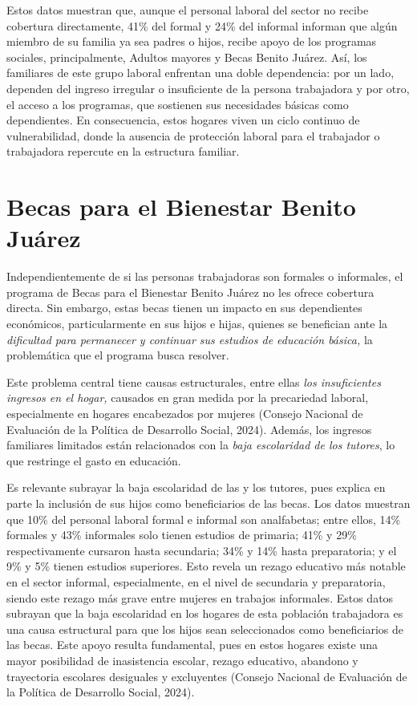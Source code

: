 \documentclass[
  spanish,
  11.5pt,
  170mm x 240mmpaper,
]{scrbook}
\begin{document}
Estos datos muestran que, aunque el personal laboral del sector no
recibe cobertura directamente, 41\% del formal y 24\% del informal
informan que algún miembro de su familia ya sea padres o hijos, recibe
apoyo de los programas sociales, principalmente, Adultos mayores y Becas
Benito Juárez. Así, los familiares de este grupo laboral enfrentan una
doble dependencia: por un lado, dependen del ingreso irregular o
insuficiente de la persona trabajadora y por otro, el acceso a los
programas, que sostienen sus necesidades básicas como dependientes. En
consecuencia, estos hogares viven un ciclo continuo de vulnerabilidad,
donde la ausencia de protección laboral para el trabajador o trabajadora
repercute en la estructura familiar.

\section{Becas para el Bienestar Benito
Juárez}\label{becas-para-el-bienestar-benito-juuxe1rez}

Independientemente de si las personas trabajadoras son formales o
informales, el programa de Becas para el Bienestar Benito Juárez no les
ofrece cobertura directa. Sin embargo, estas becas tienen un impacto en
sus dependientes económicos, particularmente en sus hijos e hijas,
quienes se benefician ante la \emph{dificultad para permanecer y
continuar sus estudios de educación básica,} la problemática que el
programa busca resolver.

Este problema central tiene causas estructurales, entre ellas \emph{los
insuficientes ingresos en el hogar,} causados en gran medida por la
precariedad laboral, especialmente en hogares encabezados por mujeres
(Consejo Nacional de Evaluación de la Política de Desarrollo Social,
2024). Además, los ingresos familiares limitados están relacionados con
la \emph{baja escolaridad de los tutores}, lo que restringe el gasto en
educación.

Es relevante subrayar la baja escolaridad de las y los tutores, pues
explica en parte la inclusión de sus hijos como beneficiarios de las
becas. Los datos muestran que 10\% del personal laboral formal e
informal son analfabetas; entre ellos, 14\% formales y 43\% informales
solo tienen estudios de primaria; 41\% y 29\% respectivamente cursaron
hasta secundaria; 34\% y 14\% hasta preparatoria; y el 9\% y 5\% tienen
estudios superiores. Esto revela un rezago educativo más notable en el
sector informal, especialmente, en el nivel de secundaria y
preparatoria, siendo este rezago más grave entre mujeres en trabajos
informales. Estos datos subrayan que la baja escolaridad en los hogares
de esta población trabajadora es una causa estructural para que los
hijos sean seleccionados como beneficiarios de las becas. Este apoyo
resulta fundamental, pues en estos hogares existe una mayor posibilidad
de inasistencia escolar, rezago educativo, abandono y trayectoria
escolares desiguales y excluyentes (Consejo Nacional de Evaluación de la
Política de Desarrollo Social, 2024).
\end{document}
